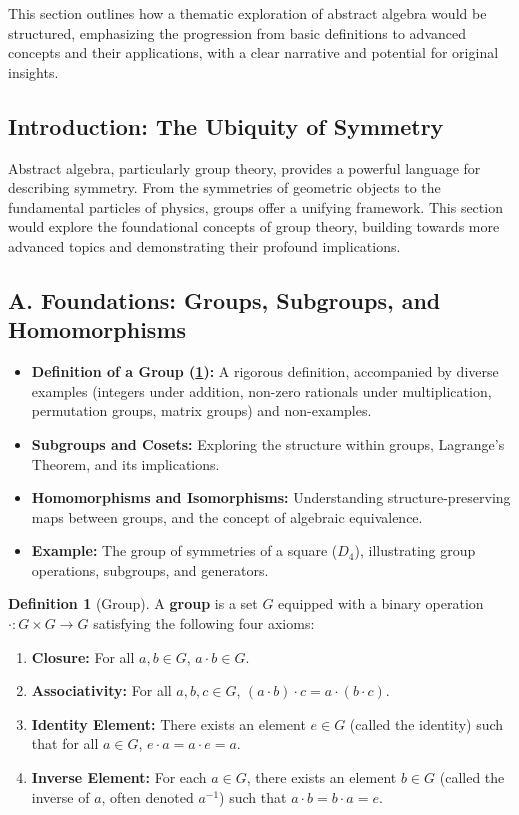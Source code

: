 \documentclass[11pt, a4paper]{article}
\theoremstyle{plain} %
\theoremstyle{definition} %
\newtheorem{definition}[theorem]{Definition}
\theoremstyle{remark} %
\begin{document}
This section outlines how a thematic exploration of abstract algebra would be structured, emphasizing the progression from basic definitions to advanced concepts and their applications, with a clear narrative and potential for original insights.

\subsection{Introduction: The Ubiquity of Symmetry}

Abstract algebra, particularly group theory, provides a powerful language for describing symmetry. From the symmetries of geometric objects to the fundamental particles of physics, groups offer a unifying framework. This section would explore the foundational concepts of group theory, building towards more advanced topics and demonstrating their profound implications.

\subsection{A. Foundations: Groups, Subgroups, and Homomorphisms}
\begin{itemize}
    \item \textbf{Definition of a Group (\ref{def:group}):} A rigorous definition, accompanied by diverse examples (integers under addition, non-zero rationals under multiplication, permutation groups, matrix groups) and non-examples.
    \item \textbf{Subgroups and Cosets:} Exploring the structure within groups, Lagrange's Theorem, and its implications.
    \item \textbf{Homomorphisms and Isomorphisms:} Understanding structure-preserving maps between groups, and the concept of algebraic equivalence.
\item \textbf{Example:} The group of symmetries of a square (\(D_4\)), illustrating group operations, subgroups, and generators.
\end{itemize}

\begin{definition}[Group]
    \label{def:group}
    A \textbf{group} is a set \( G \) equipped with a binary operation \( \cdot: G \times G \to G \) satisfying the following four axioms:
    \begin{enumerate}
        \item \textbf{Closure:} For all \( a,b \in G \), \( a \cdot b \in G \).
        \item \textbf{Associativity:} For all \( a,b,c \in G \), \( (a \cdot b) \cdot c = a \cdot (b \cdot c) \).
        \item \textbf{Identity Element:} There exists an element \( e \in G \) (called the identity) such that for all \( a \in G \), \( e \cdot a = a \cdot e = a \).
        \item \textbf{Inverse Element:} For each \( a \in G \), there exists an element \( b \in G \) (called the inverse of \( a \), often denoted \( a^{-1} \)) such that \( a \cdot b = b \cdot a = e \).
    \end{enumerate}
\end{definition}
\end{document}
